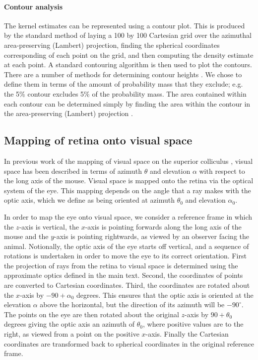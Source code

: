\documentclass[10pt]{article}
\begin{document}
\paragraph{Contour analysis}
The kernel estimates can be represented using a contour plot. This is
produced by the standard method \cite{FisherEtal1987} of laying a 100
by 100 Cartesian grid over the azimuthal area-preserving (Lambert)
projection, finding the spherical coordinates corresponding of each
point on the grid, and then computing the density estimate at each
point. A standard contouring algorithm is then used to plot the
contours. There are a number of methods for determining contour
heights \cite{FisherEtal1987}. We chose to define them in terms of the
amount of probability mass that they exclude; e.g. the 5\% contour
excludes 5\% of the probability mass. The area contained within each
contour can be determined simply by finding the area within the
contour in the area-preserving (Lambert) projection \cite{FisherEtal1987}. 

\subsection*{Mapping of retina onto visual space}
In previous work of the mapping of visual space on the superior
colliculus \cite{DragerHubel1976}, visual space has been described
in terms of azimuth  $\theta $  and elevation  $\alpha $  with
respect to the long axis of the mouse. Visual space is mapped onto
the retina via the optical system of the eye. This mapping depends on
the angle that a ray makes with the optic axis, which we define as
being oriented at azimuth  $\theta _0$  and  elevation  $\alpha _0$.

In order to map the eye onto visual space, we consider a reference
frame in which the $z${}-axis is vertical, the
$x${}-axis is pointing forwards along the long axis of the
mouse and the $y${}-axis is pointing rightwards, as viewed by
an observer facing the animal. Notionally, the optic axis of the eye
starts off vertical, and a sequence of rotations is undertaken in
order to move the eye to its correct orientation. First the
projection of rays from the retina to visual space is determined
using the approximate optics defined in the main text. Second, the
coordinates of points are converted to Cartesian coordinates. Third,
the coordinates are rotated about the $x${}-axis by 
$-90+\alpha _0$ degrees. This ensures that the optic axis is oriented
at the elevation  $\alpha $ above the horizontal, but the direction
of its azimuth will be  $-90^{\circ }$. The points on the eye are
then rotated about the original $z${}-axis by  $90+\theta _0$
degrees giving the optic axis an azimuth of  $\theta _0$, where
positive values are to the right, as viewed from a point on the
positive $x${}-axis. Finally the Cartesian coordinates are
transformed back to spherical coordinates in the original reference
frame.
\end{document}

